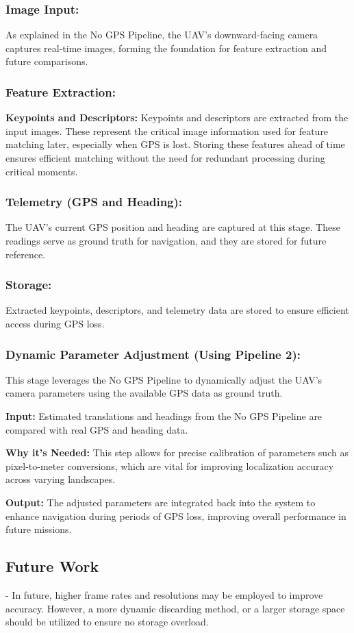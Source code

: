 \subsubsection*{Image Input:}
As explained in the No GPS Pipeline, the UAV’s downward-facing camera captures real-time images, forming the foundation for feature extraction and future comparisons.

\subsubsection*{Feature Extraction:}
\textbf{Keypoints and Descriptors:}
Keypoints and descriptors are extracted from the input images. These represent the critical image information used for feature matching later, especially when GPS is lost. Storing these features ahead of time ensures efficient matching without the need for redundant processing during critical moments.

\subsubsection*{Telemetry (GPS and Heading):}
The UAV’s current GPS position and heading are captured at this stage. These readings serve as ground truth for navigation, and they are stored for future reference.

\subsubsection*{Storage:}
Extracted keypoints, descriptors, and telemetry data are stored to ensure efficient access during GPS loss.

\subsubsection*{Dynamic Parameter Adjustment (Using Pipeline 2):}
This stage leverages the No GPS Pipeline to dynamically adjust the UAV's camera parameters using the available GPS data as ground truth.

\textbf{Input:}
Estimated translations and headings from the No GPS Pipeline are compared with real GPS and heading data.

\textbf{Why it’s Needed:}
This step allows for precise calibration of parameters such as pixel-to-meter conversions, which are vital for improving localization accuracy across varying landscapes.

\textbf{Output:}
The adjusted parameters are integrated back into the system to enhance navigation during periods of GPS loss, improving overall performance in future missions.








\subsection*{Future Work}
- In future, higher frame rates and resolutions may be employed to improve accuracy. However, a more dynamic discarding method, or a larger storage space should be utilized to ensure no storage overload. 


